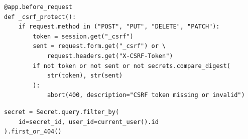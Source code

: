 \begin{lstlisting}[caption={Проверка CSRF-токена изменяющих запросов},label={lst:csrf}]
@app.before_request
def _csrf_protect():
    if request.method in ("POST", "PUT", "DELETE", "PATCH"):
        token = session.get("_csrf")
        sent = request.form.get("_csrf") or \
            request.headers.get("X-CSRF-Token")
        if not token or not sent or not secrets.compare_digest(
            str(token), str(sent)
        ):
            abort(400, description="CSRF token missing or invalid")
\end{lstlisting}

\begin{lstlisting}[caption={Выборка секрета только по идентификатору владельца},label={lst:owner}]
secret = Secret.query.filter_by(
    id=secret_id, user_id=current_user().id
).first_or_404()
\end{lstlisting}
